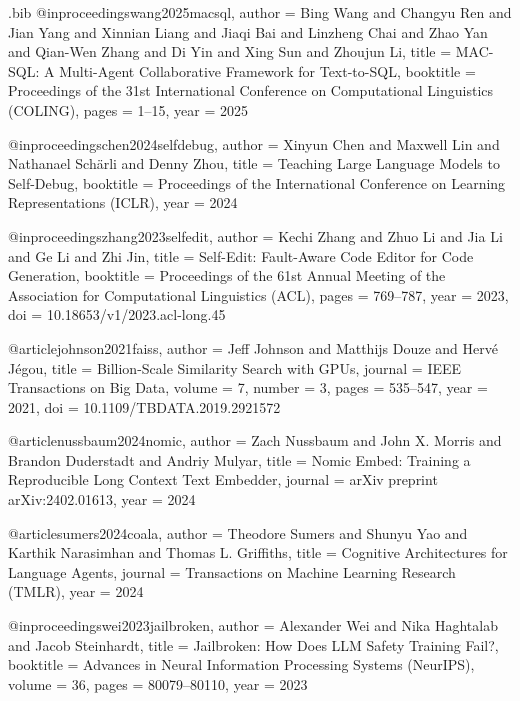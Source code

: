 \begin{filecontents*}{\jobname.bib}
@inproceedings{wang2025macsql,
  author    = {Bing Wang and Changyu Ren and Jian Yang and Xinnian Liang and Jiaqi Bai and Linzheng Chai and Zhao Yan and Qian-Wen Zhang and Di Yin and Xing Sun and Zhoujun Li},
  title     = {{MAC-SQL}: A Multi-Agent Collaborative Framework for Text-to-{SQL}},
  booktitle = {Proceedings of the 31st International Conference on Computational Linguistics (COLING)},
  pages     = {1--15},
  year      = {2025}
}

@inproceedings{chen2024selfdebug,
  author    = {Xinyun Chen and Maxwell Lin and Nathanael Sch{\"a}rli and Denny Zhou},
  title     = {Teaching Large Language Models to Self-Debug},
  booktitle = {Proceedings of the International Conference on Learning Representations (ICLR)},
  year      = {2024}
}

@inproceedings{zhang2023selfedit,
  author    = {Kechi Zhang and Zhuo Li and Jia Li and Ge Li and Zhi Jin},
  title     = {Self-Edit: Fault-Aware Code Editor for Code Generation},
  booktitle = {Proceedings of the 61st Annual Meeting of the Association for Computational Linguistics (ACL)},
  pages     = {769--787},
  year      = {2023},
  doi       = {10.18653/v1/2023.acl-long.45}
}

@article{johnson2021faiss,
  author    = {Jeff Johnson and Matthijs Douze and Herv{\'e} J{\'e}gou},
  title     = {Billion-Scale Similarity Search with {GPUs}},
  journal   = {IEEE Transactions on Big Data},
  volume    = {7},
  number    = {3},
  pages     = {535--547},
  year      = {2021},
  doi       = {10.1109/TBDATA.2019.2921572}
}

@article{nussbaum2024nomic,
  author    = {Zach Nussbaum and John X. Morris and Brandon Duderstadt and Andriy Mulyar},
  title     = {Nomic Embed: Training a Reproducible Long Context Text Embedder},
  journal   = {arXiv preprint arXiv:2402.01613},
  year      = {2024}
}

@article{sumers2024coala,
  author    = {Theodore Sumers and Shunyu Yao and Karthik Narasimhan and Thomas L. Griffiths},
  title     = {Cognitive Architectures for Language Agents},
  journal   = {Transactions on Machine Learning Research (TMLR)},
  year      = {2024}
}

@inproceedings{wei2023jailbroken,
  author    = {Alexander Wei and Nika Haghtalab and Jacob Steinhardt},
  title     = {Jailbroken: How Does {LLM} Safety Training Fail?},
  booktitle = {Advances in Neural Information Processing Systems (NeurIPS)},
  volume    = {36},
  pages     = {80079--80110},
  year      = {2023}
}


\end{filecontents*}
